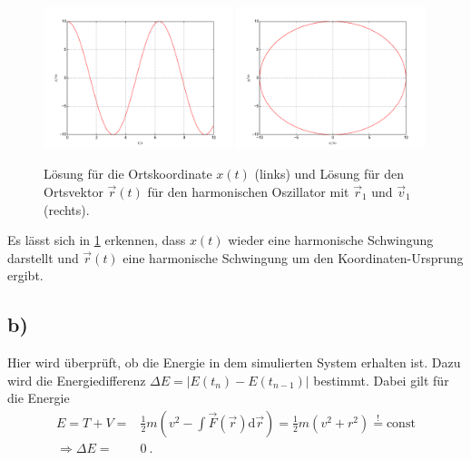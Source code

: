 \begin{figure}
	\centering
	\includegraphics[width = 0.49\textwidth]{../Plots/Plot_2_A_3}
		\includegraphics[width = 0.49\textwidth]{../Plots/Plot_2_A_2}
		\caption{Lösung für die Ortskoordinate $x(t)$ (links) und Lösung für den Ortsvektor $\vec{r}(t)$ für den harmonischen Oszillator mit $\vec{r}_1$ und $\vec{v}_1$ (rechts).\label{fig:Geschw}}
\end{figure}
Es lässt sich in \cref{fig:Geschw} erkennen, dass $x(t)$ wieder eine harmonische Schwingung darstellt und $\vec{r}(t)$ eine harmonische Schwingung um den Koordinaten-Ursprung ergibt.
\newpage

\subsection*{b)}
Hier wird überprüft, ob die Energie in dem simulierten System erhalten ist.
Dazu wird die Energiedifferenz $\Delta E= |E(t_n)-E(t_{n-1})|$ bestimmt.
Dabei gilt für die Energie
\begin{align}
	E = T + V =& \frac{1}{2}m\left( v^2 - \int \vec{F}(\vec{r})\text{d}\vec{r} \right) =\frac{1}{2}m\left( v^2 + r^2 \right) \overset{!}{=} \text{const}\\
	\Rightarrow \Delta E =& 0~.
\end{align}

